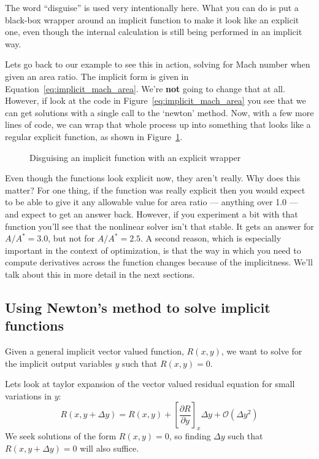 \documentclass[conf]{new-aiaa}
\begin{document}
The word ``disguise'' is used very intentionally here. What you can do is put a black-box wrapper around an implicit function to make it look like an explicit one, even though the internal calculation is still being performed in an implicit way. 

Lets go back to our example to see this in action, solving for Mach number when given an area ratio. 
The implicit form is given in Equation~\ref{eq:implicit_mach_area}. 
We're \textbf{not} going to change that at all. 
However, if look at the code in Figure~\ref{eq:implicit_mach_area} you see that we can get solutions with a single call to the `newton' method. 
Now, with a few more lines of code, we can wrap that whole process up into something that looks like a regular explicit function, as shown in Figure~\ref{fig:mach-area-fake-explicit}. 
\begin{figure}[H]
    \centering
    
    \caption{Disguising an implicit function with an explicit wrapper}
    \label{fig:mach-area-fake-explicit}
\end{figure}

Even though the functions look explicit now, they aren't really. 
Why does this matter? 
For one thing, if the function was really explicit then you would expect to be able to give it any allowable value for area ratio --- anything over 1.0 --- and expect to get an answer back. 
However, if you experiment a bit with that function you'll see that the nonlinear solver isn't that stable. 
It gets an answer for $A/A^*=3.0$, but not for $A/A^*=2.5$. 
A second reason, which is especially important in the context of optimization, is that the way in which you need to compute derivatives across the function changes because of the implicitness. 
We'll talk about this in more detail in the next sections. 


\subsection*{Using Newton's method to solve implicit functions}

Given a general implicit vector valued function, $R(x,y)$, we want to solve for the implicit output variables $y$ such that $R(x,y)=0$. 

Lets look at taylor expansion of the vector valued residual equation for small variations in $y$: 
\begin{equation}
    R(x,y+\Delta y) = R(x,y) + \left[ \frac{\partial R}{\partial y} \right]_{x} \Delta y + \mathcal{O}( \Delta y^2)
    \label{eq:newton_taylor}
\end{equation}
We seek solutions of the form $R(x,y)=0$, so finding $\Delta y$ such that $R(x,y+\Delta y)=0$ will also suffice. 
\end{document}
